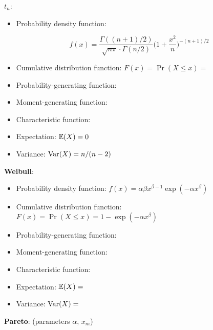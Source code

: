 \textbf{\(t_n\)}:

\begin{itemize}

\item Probability density function: 

\[
f(x)  = \frac{\Gamma((n+1)/2)}{\sqrt{n \pi} \cdot \Gamma(n/2)} \bigg( 1 + \frac{x^2}{n} \bigg)^{-(n+1)/2}
\]

\item Cumulative distribution function: \(F(x) = \Pr(X \leq x) = \)

\item Probability-generating function:

\item Moment-generating function:

\item Characteristic function:

\item Expectation: \(\E(X) = 0  \)

\item Variance: \(\Var(X) = n/(n-2)\)

\end{itemize}

\textbf{Weibull}: 

\begin{itemize}

\item Probability density function: \(f(x) = \alpha\beta x^{\beta - 1} \exp(- \alpha x^\beta) \)

\item Cumulative distribution function: \(F(x) = \Pr(X \leq x) = 1 - \exp(-\alpha x^\beta) \)

\item Probability-generating function:

\item Moment-generating function:

\item Characteristic function:

\item Expectation: \(\E(X) = \)

\item Variance: \(\Var(X) = \)

\end{itemize}

\textbf{Pareto}: (parameters \(\alpha\), \(x_m\))

